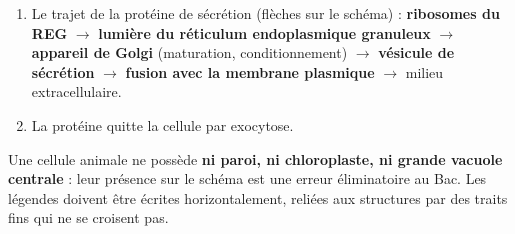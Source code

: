 \documentclass[11pt]{article}
\newcommand{\cle}[1]{{\popxbold\color{popdark}#1}}
\begin{document}
\begin{corrige}
\begin{enumerate}
\item Le trajet de la protéine de sécrétion (flèches sur le schéma) : \textbf{ribosomes du REG} $\rightarrow$ \textbf{lumière du réticulum endoplasmique granuleux} $\rightarrow$ \textbf{appareil de Golgi} (maturation, conditionnement) $\rightarrow$ \textbf{vésicule de sécrétion} $\rightarrow$ \textbf{fusion avec la membrane plasmique} $\rightarrow$ milieu extracellulaire.
\item La protéine quitte la cellule par \cle{exocytose}.
\end{enumerate}
\end{corrige}

\begin{attention}
Une cellule animale ne possède \textbf{ni paroi, ni chloroplaste, ni grande vacuole centrale} : leur présence sur le schéma est une erreur éliminatoire au Bac. Les légendes doivent être écrites horizontalement, reliées aux structures par des traits fins qui ne se croisent pas.
\end{attention}
\end{document}
